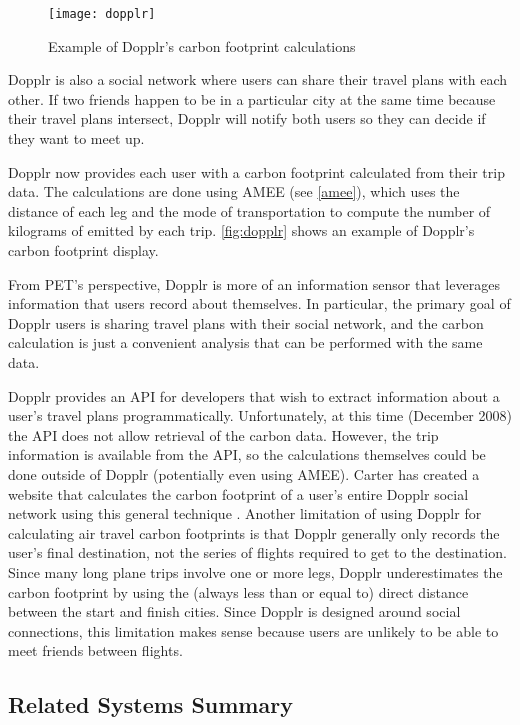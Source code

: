 \begin{figure}[htb]
	\begin{center}
		\texttt{[image: dopplr]}
		\caption{Example of Dopplr's carbon footprint calculations}
		\label{fig:dopplr}
 	\end{center}
\end{figure}

Dopplr is also a social network where users can share their travel plans with each other. If two friends happen to be in a particular city at the same time because their travel plans intersect, Dopplr will notify both users so they can decide if they want to meet up.

Dopplr now provides each user with a carbon footprint calculated from their trip data. The calculations are done using AMEE (see \autoref{amee}), which uses the distance of each leg and the mode of transportation to compute the number of kilograms of \COtwo emitted by each trip. \autoref{fig:dopplr} shows an example of Dopplr's carbon footprint display.

From PET's perspective, Dopplr is more of an information sensor that leverages information that users record about themselves. In particular, the primary goal of Dopplr users is sharing travel plans with their social network, and the carbon calculation is just a convenient analysis that can be performed with the same data.

Dopplr provides an API for developers that wish to extract information about a user's travel plans programmatically. Unfortunately, at this time (December 2008) the API does not allow retrieval of the carbon data. However, the trip information is available from the API, so the calculations themselves could be done outside of Dopplr (potentially even using AMEE). Carter has created a website that calculates the carbon footprint of a user's entire Dopplr social network using this general technique \cite{offsetr-website}. Another limitation of using Dopplr for calculating air travel carbon footprints is that Dopplr generally only records the user's final destination, not the series of flights required to get to the destination. Since many long plane trips involve one or more legs, Dopplr underestimates the carbon footprint by using the (always less than or equal to) direct distance between the start and finish cities. Since Dopplr is designed around social connections, this limitation makes sense because users are unlikely to be able to meet friends between flights.

\subsection{Related Systems Summary}

